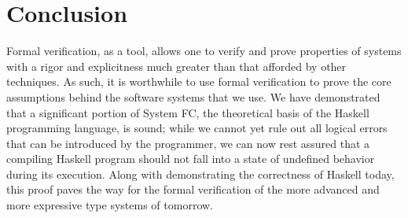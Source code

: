 \documentclass{sig-alternate}
\begin{document}
\section{Conclusion}
\label{sec:conclusion}

Formal verification, as a tool, allows one to verify and prove properties of systems with a rigor and explicitness much greater than that afforded by other techniques. As such, it is worthwhile to use formal verification to prove the core assumptions behind the software systems that we use. We have demonstrated that a significant portion of System FC, the theoretical basis of the Haskell programming language, is sound; while we cannot yet rule out all logical errors that can be introduced by the programmer, we can now rest assured that a compiling Haskell program should not fall into a state of undefined behavior during its execution. Along with demonstrating the correctness of Haskell today, this proof paves the way for the formal verification of the more advanced and more expressive type systems of tomorrow.


\vspace{175pt}
\end{document}
